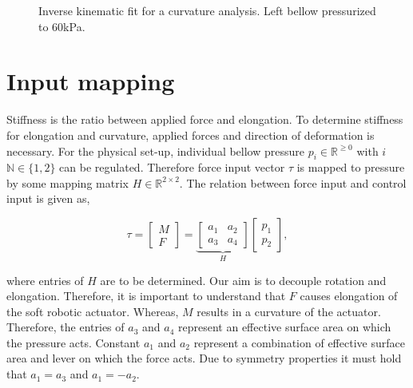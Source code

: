 \begin{figure}[H]
\begin{minipage}{0.5\textwidth}
        \caption{Inverse kinematic fit for a curvature analysis. Left bellow pressurized to 60kPa.}
        \label{fig3:nodalfitcurv}
    \end{minipage}
\end{figure}




\section{Input mapping}
\label{sec3:InputMapping}

Stiffness is the ratio between applied force and elongation. To determine  stiffness for elongation and curvature, applied forces and direction of deformation is necessary. For the physical set-up, individual bellow pressure $p_i \in \mathbb{R}^{\geq 0}$ with $i$ $\mathbb{N} \in \{1,2\}$ can be regulated. Therefore force input vector $\tau$ is mapped to pressure by some mapping matrix $H \in \mathbb{R}^{2 \times 2}$. The relation between force input and control input is given as, 

\begin{equation}
   \tau =   \begin{bmatrix} M \\ F \end{bmatrix}     = \underbrace{\begin{bmatrix}  a_1 & a_2 \\ a_3 & a_4 \end{bmatrix}}_{H}         \begin{bmatrix}  p_1 \\ p_2 \end{bmatrix}, \label{eq3:H}
\end{equation}

where entries of $H$ are to be determined. Our aim is to decouple rotation and elongation. Therefore, it is important to understand that $F$ causes elongation of the soft robotic actuator. Whereas, $M$ results in a curvature of the actuator. Therefore, the entries of $a_3$ and $a_4$ represent an effective surface area on which the pressure acts. Constant $a_1$ and $a_2$ represent a combination of effective surface area and lever on which the force acts. Due to symmetry properties it must hold that $a_1 = a_3$ and $a_1 = -a_2$.

